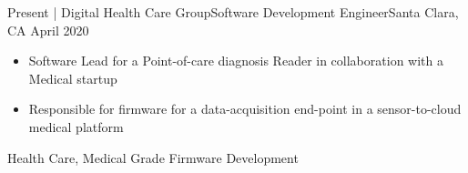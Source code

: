 %
%
%

\begin{experiences}
  \experience
    {Present}     {| Digital Health Care Group}{Software Development Engineer}{Santa Clara, CA}
    {April 2020}    {
                      \begin{itemize}
                        \item Software Lead for a Point-of-care diagnosis Reader in collaboration with a Medical startup  \\
                        \item Responsible for firmware for a data-acquisition end-point in a sensor-to-cloud medical platform \\
                      \end{itemize}
                    }
                    {Health Care, Medical Grade Firmware Development}


\end{experiences}
